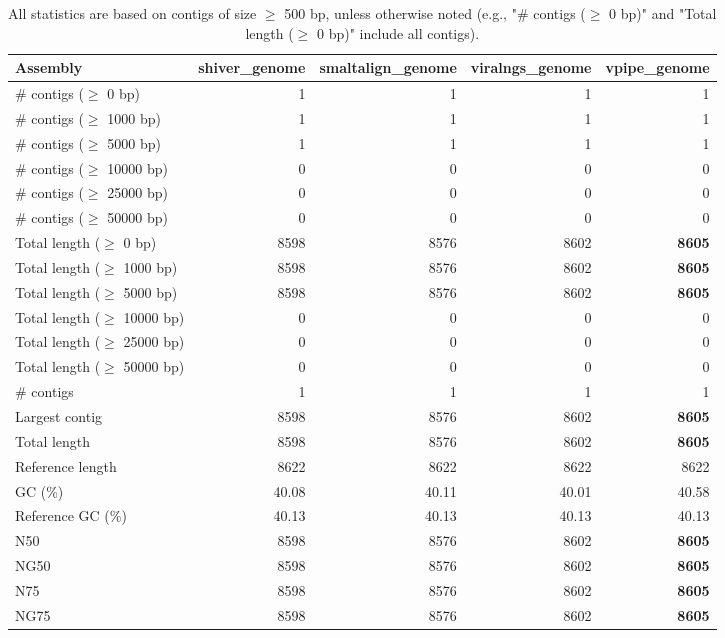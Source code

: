 \documentclass[12pt,a4paper]{article}
\begin{document}
\begin{table}[ht]
\begin{center}
\caption{All statistics are based on contigs of size $\geq$ 500 bp, unless otherwise noted (e.g., "\# contigs ($\geq$ 0 bp)" and "Total length ($\geq$ 0 bp)" include all contigs).}
\begin{tabular}{|l*{4}{|r}|}
\hline
Assembly & shiver\_genome & smaltalign\_genome & viralngs\_genome & vpipe\_genome \\ \hline
\# contigs ($\geq$ 0 bp) & 1 & 1 & 1 & 1 \\ \hline
\# contigs ($\geq$ 1000 bp) & 1 & 1 & 1 & 1 \\ \hline
\# contigs ($\geq$ 5000 bp) & 1 & 1 & 1 & 1 \\ \hline
\# contigs ($\geq$ 10000 bp) & 0 & 0 & 0 & 0 \\ \hline
\# contigs ($\geq$ 25000 bp) & 0 & 0 & 0 & 0 \\ \hline
\# contigs ($\geq$ 50000 bp) & 0 & 0 & 0 & 0 \\ \hline
Total length ($\geq$ 0 bp) & 8598 & 8576 & 8602 & {\bf 8605} \\ \hline
Total length ($\geq$ 1000 bp) & 8598 & 8576 & 8602 & {\bf 8605} \\ \hline
Total length ($\geq$ 5000 bp) & 8598 & 8576 & 8602 & {\bf 8605} \\ \hline
Total length ($\geq$ 10000 bp) & 0 & 0 & 0 & 0 \\ \hline
Total length ($\geq$ 25000 bp) & 0 & 0 & 0 & 0 \\ \hline
Total length ($\geq$ 50000 bp) & 0 & 0 & 0 & 0 \\ \hline
\# contigs & 1 & 1 & 1 & 1 \\ \hline
Largest contig & 8598 & 8576 & 8602 & {\bf 8605} \\ \hline
Total length & 8598 & 8576 & 8602 & {\bf 8605} \\ \hline
Reference length & 8622 & 8622 & 8622 & 8622 \\ \hline
GC (\%) & 40.08 & 40.11 & 40.01 & 40.58 \\ \hline
Reference GC (\%) & 40.13 & 40.13 & 40.13 & 40.13 \\ \hline
N50 & 8598 & 8576 & 8602 & {\bf 8605} \\ \hline
NG50 & 8598 & 8576 & 8602 & {\bf 8605} \\ \hline
N75 & 8598 & 8576 & 8602 & {\bf 8605} \\ \hline
NG75 & 8598 & 8576 & 8602 & {\bf 8605} \\ \hline

\end{tabular}
\end{center}
\end{table}
\end{document}

